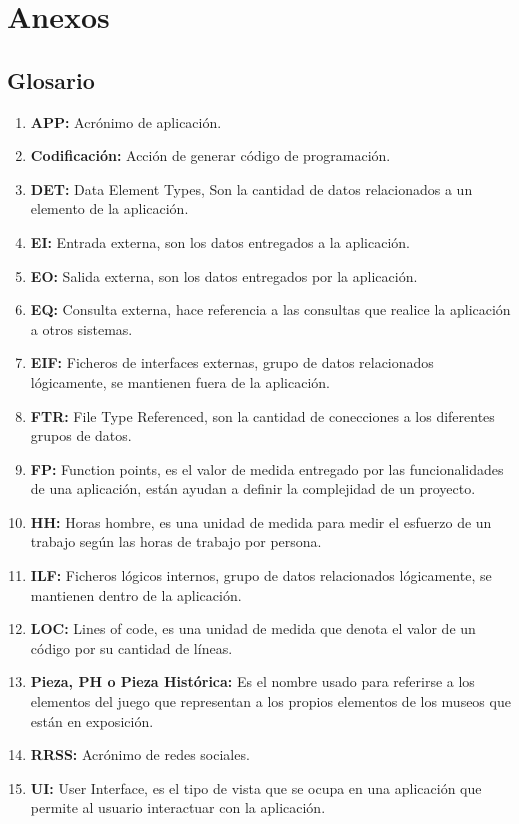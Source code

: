 \section{Anexos}





\subsection{Glosario}



\begin{enumerate}
	\item \textbf{APP:} Acrónimo de aplicación.
	\item \textbf{Codificación:} Acción de generar código de programación.
	\item \textbf{DET:} Data Element Types, Son la cantidad de datos relacionados a un elemento de la aplicación.
	\item \textbf{EI:} Entrada externa, son los datos entregados a la aplicación.
	\item \textbf{EO:} Salida externa, son los datos entregados por la aplicación.
	\item \textbf{EQ:} Consulta externa, hace referencia a las consultas que realice la aplicación a otros sistemas.
	\item \textbf{EIF:} Ficheros de interfaces externas, grupo de datos relacionados lógicamente, se mantienen fuera de la aplicación.
	\item \textbf{FTR:} File Type Referenced, son la cantidad de conecciones a los diferentes grupos de datos.
	\item \textbf{FP:} Function points, es el valor de medida entregado por las funcionalidades de una aplicación, están ayudan a definir la complejidad de un proyecto.
	\item \textbf{HH:} Horas hombre, es una unidad de medida para medir el esfuerzo de un trabajo según las horas de trabajo por persona.
	\item \textbf{ILF:} Ficheros lógicos internos, grupo de datos relacionados lógicamente, se mantienen dentro de la aplicación.
	\item \textbf{LOC:} Lines of code, es una unidad de medida que denota el valor de un código por su cantidad de líneas.
	\item \textbf{Pieza, PH  o Pieza Histórica:} Es el nombre usado para referirse a los elementos del juego que representan a los propios elementos de los museos que están en exposición.
	\item \textbf{RRSS:} Acrónimo de redes sociales.
	\item \textbf{UI:} User Interface, es el tipo de vista que se ocupa en una aplicación que permite al usuario interactuar con la aplicación.
\end{enumerate}















